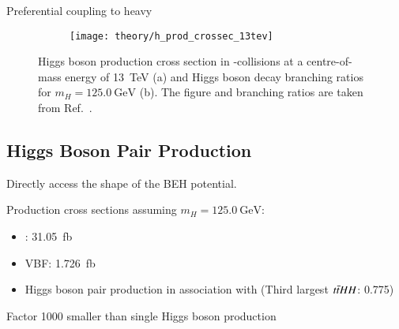 Preferential coupling to heavy

\begin{figure}[htbp]
  \centering

  \begin{subfigure}[b]{0.47\textwidth}
    \centering

    \texttt{[image: theory/h\_prod\_crossec\_13tev]}

    \label{fig:higgs_prod_xsec}
  \end{subfigure}\hfill%
  \begin{subfigure}[b]{0.47\textwidth}
    \centering

    \renewcommand{\arraystretch}{1.1}%
    

    \vspace*{0.5em}

    \label{tab:higgs_branching_ratios}
  \end{subfigure}

  \caption{Higgs boson production cross section in \pp-collisions at a
    centre-of-mass energy of \SI{13}{\TeV} (a) and Higgs boson decay branching
    ratios for $m_{H} = \SI{125.0}{\GeV}$ (b). The figure and branching ratios
    are taken from Ref.~\cite{deFlorian:2016spz}.}
\end{figure}


\subsection{Higgs Boson Pair Production}
\label{fig:theory_higgs_pair_prod}

Directly access the shape of the BEH potential.

Production cross sections assuming $m_{H} = \SI{125.0}{\GeV}$:
\begin{itemize}
\item \ggF: \SI{31.05}{\femto\barn}~\cite{Grazzini:2018bsd}
\item VBF: \SI{1.726}{\femto\barn}~\cite{Dreyer:2018qbw,LHCHWGHH}
\item Higgs boson pair production in association with \ttbar (Third largest
  $t\bar{t} HH$: \SI{0.775}{})
\end{itemize}
Factor 1000 smaller than single Higgs boson production

